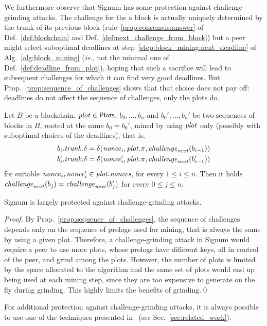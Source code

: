 We furthermore observe that Signum has some protection
against challenge-grinding attacks.
The challenge for the a block is actually uniquely determined by the trunk of its
previous block
(rule~\ref{prop:consensus:answer} of Def.~\ref{def:blockchain}
and Def.~\ref{def:next_challenge_from_block}) but a peer
might select suboptimal deadlines at step~\ref{step:block_mining:next_deadline}
of Alg.~\ref{alg:block_mining} (\textit{ie.}, not the minimal one
of Def.~\ref{def:deadline_from_plot}),
hoping that such a sacrifice will lead to subsequent challenges for which it
can find very good deadlines.
But Prop.~\ref{prop:sequence_of_challenges} shows that that
choice does not pay off: deadlines do not
affect the sequence of challenges, only the plots do.
%
\begin{proposition}\label{prop:sequence_of_challenges}
  Let $B$ be a blockchain, ${\mathit{plot}}\in{\mathsf{Plots}}$, $b_0,\ldots,b_n$ and
  $b_0',\ldots,b_n'$ be two sequences of blocks in $B$, rooted at the same
  $b_0=b_0'$, mined by using ${\mathit{plot}}$ only
  (possibly with suboptimal choices of the deadlines), that is,
  \begin{align*}
    b_i.{\mathit{trunk}}.\delta&=\delta({\mathit{nonce}}_i,{\mathit{plot}}.\pi,{\mathit{challenge}}_{\mathit{next}}(b_{i-1}))\\
    b'_i.{\mathit{trunk}}.\delta&=\delta({\mathit{nonce}}'_i,{\mathit{plot}}.\pi,{\mathit{challenge}}_{\mathit{next}}(b'_{i-1}))
  \end{align*}
  for suitable ${\mathit{nonce}}_i,{\mathit{nonce}}_i'\in{\mathit{plot}}.{\mathit{nonces}}$, for every $1\le i\le n$. Then it holds
  $%
  \challenge_\mynext(b_j)=\challenge_\mynext(b'_j)
  $ %
  for every $0\le j\le n$.
\end{proposition}
%
\begin{proposition}\label{prop:no_challenge_grinding}
  Signum is largely protected against challenge-grinding attacks.
\end{proposition}
\begin{proof}
  By Prop.~\ref{prop:sequence_of_challenges}, the
  sequence of challenges depends only on
  the sequence of prologs used for mining, that is always the same by using a given plot.
  Therefore, a challenge-grinding attack in Signum
  would require a peer to use more plots, whose prologs have different keys, all in control of the peer,
  and grind among the plots. However, the number of plots is limited by the space
  allocated to the algorithm and the same set of plots
  would end up being used at each mining step, since they are too expensive to generate
  on the fly during grinding. This highly
  limits the benefits of grinding.\qed
\end{proof}
%
For additional protection against challenge-grinding attacks, it is always possible to use
one of the techniques presented in~\cite{ParkKFGAP18} (see Sec.~\ref{sec:related_work}).

